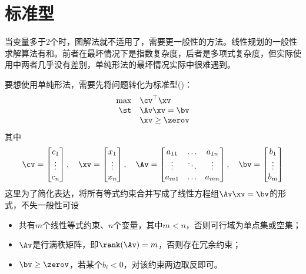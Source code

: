 \documentclass{ctexart}
\begin{document}
\section{标准型}

当变量多于$2$个时，图解法就不适用了，需要更一般性的方法。线性规划的一般性求解算法有和。前者在最坏情况下是指数复杂度，后者是多项式复杂度，但实际使用中两者几乎没有差别，单纯形法的最坏情况实际中很难遇到。

要想使用单纯形法，需要先将问题转化为标准型()：
\begin{align*}
    \begin{array}{rl}
        \max & \cv^\top \xv   \\
        \st  & \Av \xv = \bv  \\
             & \xv \ge \zerov
    \end{array}
\end{align*}
其中
\begin{align*}
    \cv = \begin{bmatrix}
              c_1 \\ \vdots \\ c_n
          \end{bmatrix}, \quad
    \xv = \begin{bmatrix}
              x_1 \\ \vdots \\ x_n
          \end{bmatrix}, \quad
    \Av= \begin{bmatrix}
             a_{11} & \ldots & a_{1n} \\
             \vdots & \ddots & \vdots \\
             a_{m1} & \ldots & a_{mn}
         \end{bmatrix}, \quad
    \bv = \begin{bmatrix}
              b_1 \\ \vdots \\ b_m
          \end{bmatrix}
\end{align*}
这里为了简化表达，将所有等式约束合并写成了线性方程组$\Av \xv = \bv$的形式，不失一般性可设
\begin{itemize}
    \item 共有$m$个线性等式约束、$n$个变量，其中$m < n$，否则可行域为单点集或空集；
    \item $\Av$是行满秩矩阵，即$\rank(\Av) = m$，否则存在冗余约束；
    \item $\bv \ge \zerov$，若某个$b_i < 0$，对该约束两边取反即可。
\end{itemize}
\end{document}
